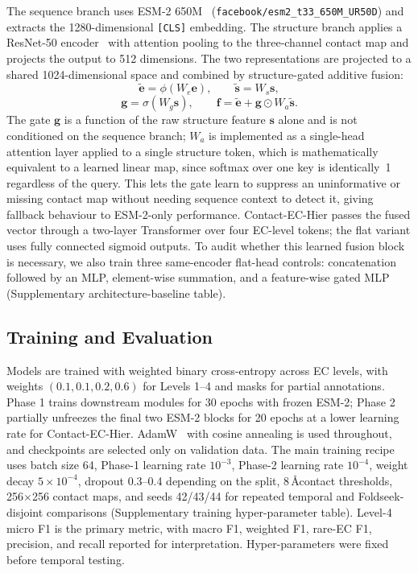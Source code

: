 \documentclass[numbered,contemporary,mediumone]{oup-authoring-template}
\begin{document}
The sequence branch uses ESM-2 650M~\citep{lin2023}
(\texttt{facebook/esm2\_t33\_650M\_UR50D}) and extracts the 1280-dimensional
\texttt{[CLS]} embedding. The structure branch applies a ResNet-50 encoder~\citep{he2016} with
attention pooling to the three-channel contact map and projects the output to 512
dimensions. The two representations are projected to a shared 1024-dimensional
space and combined by structure-gated additive fusion:
\[
\tilde{\mathbf{e}} = \phi(W_e\mathbf{e}), \qquad
\tilde{\mathbf{s}} = W_s\mathbf{s},
\]
\[
\mathbf{g} = \sigma(W_g\mathbf{s}),
\qquad
\mathbf{f} = \tilde{\mathbf{e}} + \mathbf{g}\odot W_a\tilde{\mathbf{s}}.
\]
The gate $\mathbf{g}$ is a function of the raw structure feature
$\mathbf{s}$ alone and is not conditioned on the sequence branch; $W_a$ is
implemented as a single-head attention layer applied to a single
structure token, which is mathematically equivalent to a learned linear
map, since softmax over one key is identically~1 regardless of the
query. This lets the gate learn to suppress an uninformative or missing
contact map without needing sequence context to detect it, giving
fallback behaviour to ESM-2-only performance.
Contact-EC-Hier passes the fused vector through a two-layer Transformer over four
EC-level tokens; the flat variant uses fully connected sigmoid outputs.
To audit whether this learned fusion block is necessary, we also train three
same-encoder flat-head controls: concatenation followed by an MLP, element-wise
summation, and a feature-wise gated MLP (Supplementary architecture-baseline
table).

\subsection{Training and Evaluation}

Models are trained with weighted binary cross-entropy across EC levels, with
weights $(0.1,0.1,0.2,0.6)$ for Levels 1--4 and masks for partial annotations.
Phase 1 trains downstream modules for 30 epochs with frozen ESM-2; Phase 2
partially unfreezes the final two ESM-2 blocks for 20 epochs at a lower learning
rate for Contact-EC-Hier. AdamW~\citep{loshchilov2019} with cosine annealing is used throughout, and checkpoints are selected
only on validation data. The main training recipe uses batch size 64, Phase-1
learning rate $10^{-3}$, Phase-2 learning rate $10^{-4}$, weight decay
$5\times10^{-4}$, dropout 0.3--0.4 depending on the split, 8\,\AA contact
thresholds, 256$\times$256 contact maps, and seeds 42/43/44 for repeated
temporal and Foldseek-disjoint comparisons (Supplementary training
hyper-parameter table). Level-4
micro F1 is the primary metric, with macro F1, weighted F1, rare-EC F1,
precision, and recall reported for interpretation. Hyper-parameters were fixed
before temporal testing.
\end{document}
